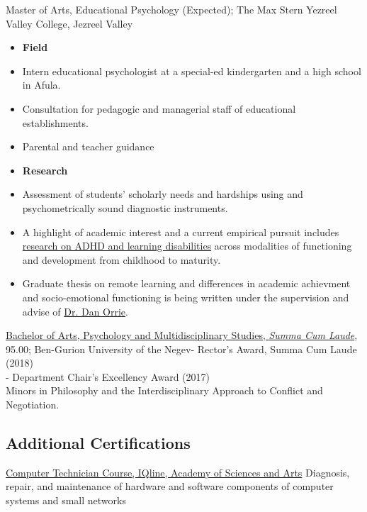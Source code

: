 {Master of Arts, Educational Psychology (Expected); The Max Stern Yezreel Valley College, Jezreel Valley}
{\begin{itemize}
\item \textbf{Field}
        \item  Intern educational psychologist at a special-ed kindergarten and a high school in Afula.  
                \item Consultation for pedagogic and managerial staff of educational establishments.
                \item  Parental and teacher guidance
\item \textbf{Research}
                \item  Assessment of students' scholarly needs and hardships using and psychometrically sound diagnostic  instruments. 
                \item A highlight of academic interest and a current empirical pursuit includes \href{https://tinyurl.com/ADHD-Coping-Seminar}{research on ADHD and learning disabilities} across modalities of functioning and development from childhood to maturity. 
                \item Graduate thesis on remote learning and differences in academic achievment and socio-emotional functioning is being written under the supervision and advise of \href{https://www.researchgate.net/scientific-contributions/Orrie-Dan-2172412162}{Dr. Dan Orrie}.
   \end{itemize}}
{}

{\href{https://www.dropbox.com/s/pcm0mybvgi85ma0/BA-Psych.pdf?dl=0}{Bachelor of Arts, Psychology and Multidisciplinary Studies, \textit{Summa Cum Laude}}, 95.00; Ben-Gurion University of the Negev}{- Rector's Award, Summa Cum Laude (2018) \\
- Department Chair’s Excellency Award (2017) \\
Minors in Philosophy and the Interdisciplinary Approach to Conflict and Negotiation.}

\subsection{Additional Certifications}
{\href{https://www.dropbox.com/s/csphxdynjdg3ze2/computer-technitian-certificate.jpg?dl=0}{Computer Technician Course, IQline, Academy of Sciences and Arts}}
{Diagnosis, repair, and maintenance of hardware and software components of computer systems and small networks}
{}

